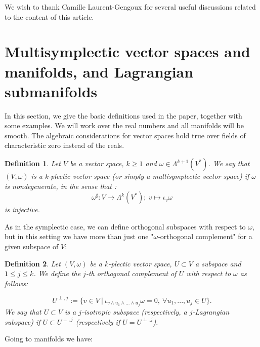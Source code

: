 \documentclass[a4paper,12pt,leqno]{article}
\newtheorem{defa}{Definition}
\begin{document}
  We wish to thank Camille Laurent-Gengoux for several useful discussions related to the content of this article.






\section{Multisymplectic vector spaces and manifolds,  and Lagrangian submanifolds}

In this section, we give the basic definitions used in the paper, together with some examples. We will work over the real numbers and 
all manifolds will be smooth. 
The algebraic considerations for vector spaces hold true over fields of characteristic zero instead of the reals.


\begin{defa}
Let $V$ be a vector space, $k\geq 1$ and $\omega\in\Lambda^{k+1}(V^*)$. We say that
$(V,\omega)$ is a k-plectic vector space 
(or simply a multisymplectic vector space) if $\omega$ is nondegenerate, in the sense that :
\begin{equation*}
\omega^{\sharp}:V\rightarrow \Lambda^k(V^*); \ v\mapsto \iota_v\omega
\end{equation*}
is injective. 
\end{defa}

As in the symplectic case, we can define orthogonal subspaces with respect to $\omega$, but in this setting
we have more than just one "$\omega$-orthogonal complement" for a given subspace of $V$:

\begin{defa}

Let $(V,\omega)$ be a $k$-plectic vector space, $U\subset V$ a subspace and $1\leq j\leq k$.
We define the $j$-th orthogonal complement of $U$ with respect to $\omega$ as follows:

\begin{equation*}
U^{\perp,j}:=\{v\in V \ | \ \iota_{v\wedge u_1\wedge...\wedge u_j}\omega=0, \ \forall u_1,...,u_j\in U \}.
\end{equation*}
We say that $U\subset V$ is a $j$-isotropic subspace (respectively, a $j$-Lagrangian subspace) if 
$U\subset U^{\perp,j}$ (respectively if $U=U^{\perp,j}$). 

\end{defa}


Going to manifolds we have:
\end{document}
